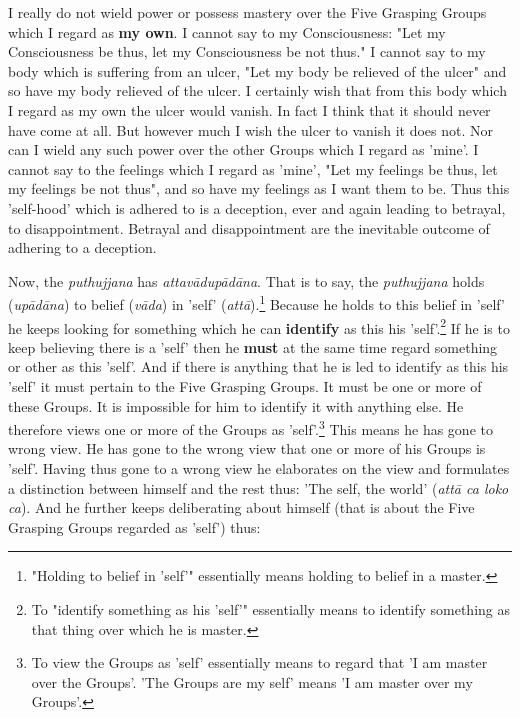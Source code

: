I really do not wield power or possess mastery over the Five Grasping Groups which I regard as \textbf{my own}. I cannot say to my Consciousness: "Let my Consciousness be thus, let my Consciousness be not thus." I cannot say to my body which is suffering from an ulcer, "Let my body be relieved of the ulcer" and so have my body relieved of the ulcer. I certainly wish that from this body which I regard as my own the ulcer would vanish. In fact I think that it should never have come at all. But however much I wish the ulcer to vanish it does not. Nor can I wield any such power over the other Groups which I regard as 'mine'. I cannot say to the feelings which I regard as 'mine', "Let my feelings be thus, let my feelings be not thus", and so have my feelings as I want them to be. Thus this 'self-hood' which is adhered to is a deception, ever and again leading to betrayal, to disappointment. Betrayal and disappointment are the inevitable outcome of adhering to a deception.

Now, the \emph{puthujjana} has \emph{attavādupādāna}. That is to say, the \emph{puthujjana} holds (\emph{upādāna}) to belief (\emph{vāda}) in 'self' (\emph{attā}).\footnote{"Holding to belief in 'self'" essentially means holding to belief in a master.} Because he holds to this belief in 'self' he keeps looking for something which he can \textbf{identify} as this his 'self'.\footnote{To "identify something as his 'self'" essentially means to identify something as that thing over which he is master.} If he is to keep believing there is a 'self' then he \textbf{must} at the same time regard something or other as this 'self'. And if there is anything that he is led to identify as this his 'self' it must pertain to the Five Grasping Groups. It must be one or more of these Groups. It is impossible for him to identify it with anything else. He therefore views one or more of the Groups as 'self'.\footnote{To view the Groups as 'self' essentially means to regard that 'I am master over the Groups'. 'The Groups are my self' means 'I am master over my Groups'.} This means he has gone to wrong view. He has gone to the wrong view that one or more of his Groups is 'self'. Having thus gone to a wrong view he elaborates on the view and formulates a distinction between himself and the rest thus: 'The self, the world' (\emph{attā ca loko ca}). And he further keeps deliberating about himself (that is about the Five Grasping Groups regarded as 'self') thus:


